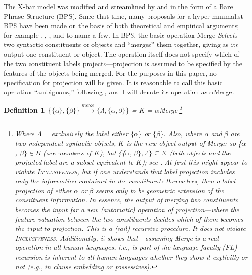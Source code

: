 \documentclass[11pt,twoside]{article}
\theoremstyle{plain}
\newtheorem{definition}{Definition}
\numberwithin{equation}{section}
\theoremstyle{definition}
\newtheorem{phrase string}{Phrase String}
\begin{document}
The X-bar model was modified and streamlined by \cite{chomsky94bps} and \cite{chomsky95bps} in the form of a Bare Phrase Structure (BPS). Since that time, many proposals for a hyper-minimalist BPS have been made on the basis of both theoretical and empirical arguments; for example \cite{carnie:2000}, \cite{citko:2005}, \cite{collins:2001}, and \cite{jayaseelan:2008} to name a few. In BPS, the basic operation Merge \textsl{Selects} two syntactic constituents or objects and ``merges'' them together, giving as its output one constituent or object. The operation itself does not specify which of the two constituent labels projects---projection is assumed to be specified by the features of the objects being merged. For the purposes in this paper, no specification for projection will be given. It is reasonable to call this basic operation ``ambiguous,'' following \cite{boeckx08bare}, and I will denote its operation as $\alpha$Merge. 


\begin{definition}
$\{\{\alpha\}, \{\beta\}\} \stackrel{merge}{\longrightarrow} \{\Lambda, \{\alpha, \beta\}\}$ = $K$ = $\alpha$Merge \label{amerge}
\footnote{Where $\Lambda$ = exclusively the label either $\{\alpha\}$ or $\{\beta\}$. Also, where $\alpha$ and $\beta$ are two independent syntactic objects, $K$ is the new object output of Merge: so \{$\alpha$, $\beta\} \in K$ (are members of $K$), but \{\{$\alpha$, $\beta\}, \Lambda\} \subseteq K$ (both objects \textsl{and} the projected label are a subset equivalent to $K$); see \cite{chomsky95mp}. At first this might appear to violate \textsc{Inclusiveness}, but if one understands that label projection includes only the information contained in the constituents themselves, then a label projection of either $\alpha$ or $\beta$ seems only to be geometric extension of the constituent information. In essence, the output of merging two constituents becomes the input for a new (automatic) operation of projection---where the feature valuation between the two constituents decides which of them becomes the input to projection. This is a (tail) recursive procedure. It does not violate \textsc{Inclusiveness}. Additionally, it shows that---assuming Merge is a real operation in all human languages, i.e., is part of the language faculty (FL)---recursion is inherent to all human languages whether they show it explicitly or not (e.g., in clause embedding or possessives).}
\end{definition} 
\end{document}
